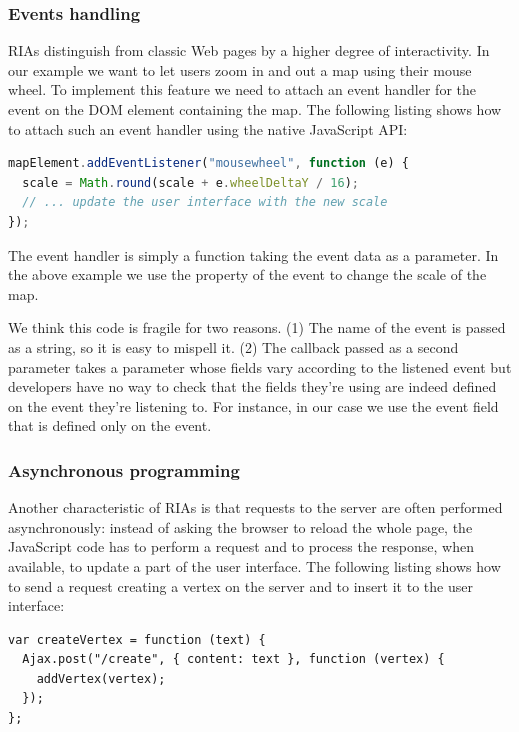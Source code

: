 \documentclass[american,english,runningheads]{llncs}
\begin{document}
\subsubsection{Events handling}

RIAs distinguish from classic Web pages by a higher degree of interactivity. In our example we want to let users zoom in and out a map using their mouse wheel. To implement this feature we need to attach an event handler for the  event on the DOM element containing the map. The following listing shows how to attach such an event handler using the native JavaScript API:

\begin{lstlisting}[language=JavaScript,label=event-js,caption=Native JavaScript API to handle events]
mapElement.addEventListener("mousewheel", function (e) {
  scale = Math.round(scale + e.wheelDeltaY / 16);
  // ... update the user interface with the new scale
});
\end{lstlisting}

The event handler is simply a function taking the event data as a parameter. In the above example we use the  property of the event to change the scale of the map.

We think this code is fragile for two reasons. (1) The name of the event is passed as a string, so it is easy to mispell it. (2) The callback passed as a second parameter takes a parameter  whose fields vary according to the listened event but developers have no way to check that the fields they’re using are indeed defined on the event they’re listening to. For instance, in our case we use the  event field that is defined only on the  event.

\subsubsection{Asynchronous programming}

Another characteristic of RIAs is that requests to the server are often performed asynchronously: instead of asking the browser to reload the whole page, the JavaScript code has to perform a request and to process the response, when available, to update a part of the user interface. The following listing shows how to send a request creating a vertex on the server and to insert it to the user interface:

\begin{lstlisting}
var createVertex = function (text) {
  Ajax.post("/create", { content: text }, function (vertex) {
    addVertex(vertex);
  });
};
\end{lstlisting}
\end{document}
